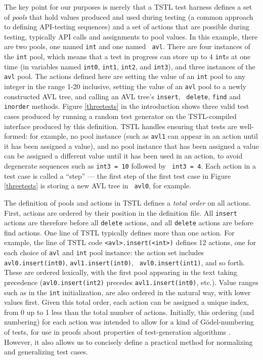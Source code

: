 The key point for our purposes is merely that a TSTL test harness
defines a set of \emph{pools} that hold values produced and used
during testing \cite{AndrewsTR} (a common approach to defining
API-testing sequences) and a set of actions that are possible during
testing, typically API calls and assignments to pool values.  In this
example, there are two pools, one named {\tt int} and one named {\tt
  avl}.  There are four instances of the {\tt int} pool, which means
that a test in progress can store up to 4 {\tt int}s at one time (in
variables named {\tt int0}, {\tt int1}, {\tt int2}, and {\tt int3}), and three
instances of the {\tt avl} pool.  The actions defined here are setting
the value of an {\tt int} pool to any integer in the range 1-20
inclusive, setting the value of an {\tt avl} pool to a newly
constructed AVL tree, and calling an AVL tree's {\tt insert}, {\tt
  delete}, {\tt find} and {\tt inorder} methods.  Figure
\ref{threetests} in the introduction shows three
valid test cases produced by running a random test generator on
the TSTL-compiled interface produced by this definition.  TSTL handles
ensuring that tests are well-formed: for example, no pool instance
(such as {\tt avl1} can appear in an action until it has been assigned
a value), and no pool instance that has been assigned a value can be
assigned a different value until it has been used in an action, to
avoid degenerate sequences such as {\tt int3 = 10} followed by {\tt
  int3 = 4}.  Each action in a test case is called a ``step'' --- the
first step of the first test case in Figure \ref{threetests} is storing a new AVL tree in {\tt
  avl0}, for example.

The definition of pools and actions in TSTL defines a \emph{total
  order} on all actions.  First, actions are ordered by their position
in the definition file.  All {\tt insert} actions are therefore before
all {\tt delete} actions, and all {\tt delete} actions are before find
actions.  One line of TSTL typically defines more than one action. For
example, the line of TSTL code {\tt <avl>.insert(<int>)} defines 12 actions, one
for each choice of {\tt avl} and {\tt int} pool instance:  the action set
includes {\tt avl0.insert(int0)}, {\tt avl1.insert(int0)}, {\tt
  avl0.insert(int1)}, and so forth.  These are
ordered lexically, with the first pool appearing in the text taking
precedence ({\tt avl0.insert(int2)} precedes {\tt avl1.insert(int0)},
etc.).  Value ranges such as in the {\tt int} initialization, are also
ordered in the natural way, with lower values first.  Given this total
order, each action can be assigned a unique index, from 0 up to 1 less
than the total number of actions. Initially, this ordering (and
numbering) for each action was intended to allow for a kind of
G\"odel-numbering of tests, for use in proofs about
properties of test-generation algorithms
\cite{AndrewsTR}.  However, it also allows us to concisely define a
practical method for normalizing and generalizing test cases.

